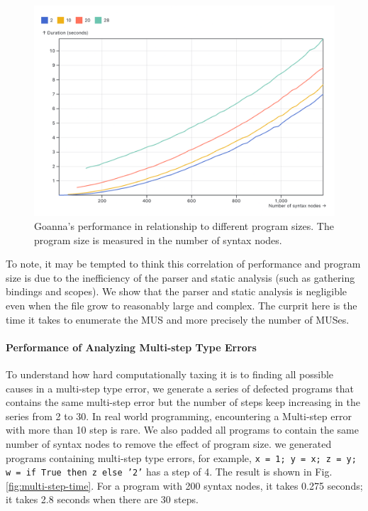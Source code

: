 \documentclass[pdflatex,sn-mathphys-num]{sn-jnl}%
\begin{document}
    \begin{figure}[ht]
        \centering
        \includegraphics[width=0.8\linewidth]{images/program-size.png}
        \caption{Goanna's performance in relationship to different program sizes. The program size is measured in the number of syntax nodes.}
        \label{fig:node-size}
    \end{figure}

    To note, it may be tempted to think this correlation of performance and program size is due to the inefficiency of the parser and static analysis (such as gathering bindings and scopes). We show that the parser and static analysis is negligible even when the file grow to reasonably large and complex. The curprit here is the time it takes to enumerate the MUS and more precisely the number of MUSes. 


    
    \paragraph{\textbf{Performance of Analyzing Multi-step Type Errors}}
   To understand how hard computationally taxing it is to finding all possible causes in a multi-step type error, we generate a series of defected programs that contains the same multi-step error but the number of steps keep increasing in the series from 2 to 30. In real world programming, encountering a Multi-step error with more than 10 step is rare. We also padded all programs to contain the same number of syntax nodes to remove the effect of program size. we generated programs containing multi-step type errors, for example, \texttt{x = 1; y = x; z = y; w = if True then z else '2'} has a step of 4. The result is shown in Fig. \ref{fig:multi-step-time}. For a program with 200 syntax nodes, it takes 0.275 seconds;  it takes 2.8 seconds when there are 30 steps. 
    
\end{document}
